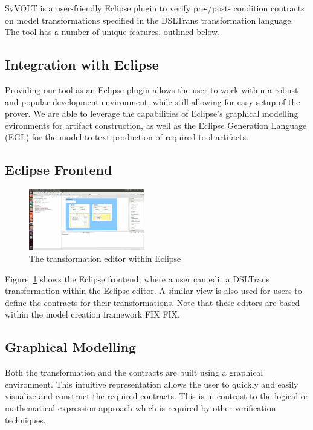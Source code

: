 SyVOLT is a user-friendly Eclipse plugin to verify pre-/post- condition contracts on model transformations specified in the DSLTrans transformation language. The tool has a number of unique features, outlined below.

\subsection{Integration with Eclipse}

Providing our tool as an Eclipse plugin allows the user to work within a robust and popular development environment, while still allowing for easy setup of the prover. We are able to leverage the capabilities of Eclipse's graphical modelling evironments for artifact construction, as well as the Eclipse Generation Language (EGL) for the model-to-text production of required tool artifacts.

\subsection{Eclipse Frontend}

\begin{figure}
\centering
\includegraphics[width=0.45\textwidth]{figures/eclipse_frontend}
\caption{The transformation editor within Eclipse}
\label{fig:eclipse_frontend}
\end{figure}

Figure~\ref{fig:eclipse_frontend} shows the Eclipse frontend, where a user can edit a DSLTrans transformation within the Eclipse editor. A similar view is also used for users to define the contracts for their transformations. Note that these editors are based within the model creation framework FIX FIX.

\subsection{Graphical Modelling}
Both the transformation and the contracts are built using a graphical environment. This intuitive representation allows the user to quickly and easily visualize and construct the required contracts. This is in contrast to  the logical or mathematical expression approach which is required by other verification techniques.

